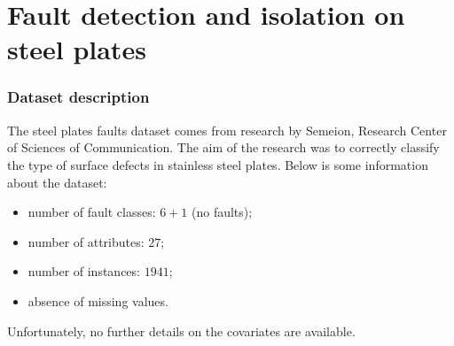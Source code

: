 \section{Fault detection and isolation on steel plates}

\begin{frame}
	\frametitle{Dataset description}
	The steel plates faults dataset comes from research by Semeion, Research Center of Sciences of Communication. The aim of the research was to correctly classify the type of surface defects in stainless steel plates. Below is some information about the dataset:
	\begin{itemize}
		\item number of fault classes: $6 + 1$ (no faults);
		\item number of attributes: $27$;
		\item number of instances: $1941$;
		\item absence of missing values.
	\end{itemize}
	Unfortunately, no further details on the covariates are available.
\end{frame}

